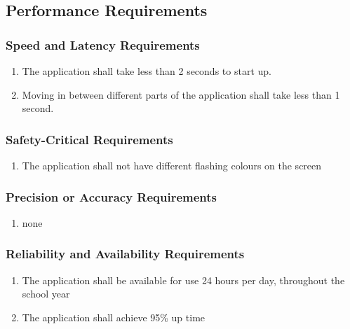 \documentclass[]{article}
\begin{document}

\subsection{Performance Requirements}
\label{sub:performance_requirements}

\subsubsection{Speed and Latency Requirements}
\label{ssub:speed_and_latency_requirements}
\begin{enumerate}[{PR}1. ]
	\item The application shall take less than 2 seconds to start up.
	\item Moving in between different parts of the application shall take less than
1 second.
\end{enumerate}

\subsubsection{Safety-Critical Requirements}
\label{ssub:safety_critical_requirements}
\begin{enumerate}[{PR}1. ]
	\item The application shall not have different flashing colours on the screen
\end{enumerate}

\subsubsection{Precision or Accuracy Requirements}
\label{ssub:precision_or_accuracy_requirements}
\begin{enumerate}[{PR}1. ]
	\item none
\end{enumerate}

\subsubsection{Reliability and Availability Requirements}
\label{ssub:reliability_and_availability_requirements}
\begin{enumerate}[{PR}1. ]
	\item The application shall be available for use 24 hours per day, throughout the school year
	\item The application shall achieve 95\% up time
\end{enumerate}
\end{document}
